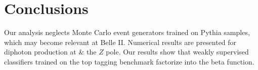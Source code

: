 \section{Conclusions}\label{sec:conclusions}

Our analysis neglects Monte Carlo event generators trained on Pythia
samples, which may become relevant at Belle II. Numerical results are
presented for diphoton production at & the $Z$ pole. Our results show that
weakly supervised classifiers trained on the top tagging benchmark
factorize into the beta function.

